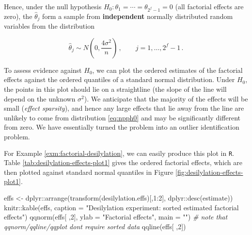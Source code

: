 \documentclass[
]{book}
\newenvironment{Shaded}{\begin{snugshade}}{\end{snugshade}}
\newcommand{\AttributeTok}[1]{\textcolor[rgb]{0.77,0.63,0.00}{#1}}
\newcommand{\CommentTok}[1]{\textcolor[rgb]{0.56,0.35,0.01}{\textit{#1}}}
\newcommand{\DecValTok}[1]{\textcolor[rgb]{0.00,0.00,0.81}{#1}}
\newcommand{\FunctionTok}[1]{\textcolor[rgb]{0.00,0.00,0.00}{#1}}
\newcommand{\NormalTok}[1]{#1}
\newcommand{\OtherTok}[1]{\textcolor[rgb]{0.56,0.35,0.01}{#1}}
\newcommand{\SpecialCharTok}[1]{\textcolor[rgb]{0.00,0.00,0.00}{#1}}
\newcommand{\StringTok}[1]{\textcolor[rgb]{0.31,0.60,0.02}{#1}}
\theoremstyle{definition}
\theoremstyle{definition}
\theoremstyle{definition}
\theoremstyle{definition}
\theoremstyle{remark}
\begin{document}
Hence, under the null hypothesis \(H_0: \theta_1 = \cdots = \theta_{2^f-1} = 0\) (all factorial effects are zero), the \(\hat{\theta}_j\) form a sample from \textbf{independent} normally distributed random variables from the distribution

\begin{equation}
\hat{\theta}_j \sim N\left(0, \frac{4\sigma^2}{n}\right)\,,\qquad j = 1, \ldots, 2^f-1\,.
\label{eq:npph0}
\end{equation}

To assess evidence against \(H_0\), we can plot the ordered estimates of the factorial effects against the ordered quantiles of a standard normal distribution. Under \(H_0\), the points in this plot should lie on a straightline (the slope of the line will depend on the unknown \(\sigma^2\)). We anticipate that the majority of the effects will be small (\emph{effect sparsity}), and hence any large effects that lie away from the line are unlikely to come from distribution \eqref{eq:npph0} and may be significantly different from zero. We have essentially turned the problem into an outlier identification problem.

For Example \ref{exm:factorial-desilylation}, we can easily produce this plot in \texttt{R}. Table \ref{tab:desilylation-effects-plot1} gives the ordered factorial effects, which are then plotted against standard normal quantiles in Figure \ref{fig:desilylation-effects-plot1}.

\begin{Shaded}
\begin{Highlighting}[]
\NormalTok{effs }\OtherTok{\textless{}{-}}\NormalTok{ dplyr}\SpecialCharTok{::}\FunctionTok{arrange}\NormalTok{(}\FunctionTok{transform}\NormalTok{(desilylation.effs)[,}\DecValTok{1}\SpecialCharTok{:}\DecValTok{2}\NormalTok{], dplyr}\SpecialCharTok{::}\FunctionTok{desc}\NormalTok{(estimate))}
\NormalTok{knitr}\SpecialCharTok{::}\FunctionTok{kable}\NormalTok{(effs, }\AttributeTok{caption =} \StringTok{"Desilylation experiment: sorted estimated factorial effects"}\NormalTok{)}
\FunctionTok{qqnorm}\NormalTok{(effs[ ,}\DecValTok{2}\NormalTok{], }\AttributeTok{ylab =} \StringTok{"Factorial effects"}\NormalTok{, }\AttributeTok{main =} \StringTok{""}\NormalTok{) }\CommentTok{\# note that qqnorm/qqline/qqplot don\textquotesingle{}t require sorted data}
\FunctionTok{qqline}\NormalTok{(effs[ ,}\DecValTok{2}\NormalTok{])}
\end{Highlighting}
\end{Shaded}
\end{document}
